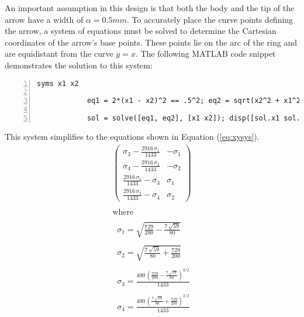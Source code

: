         An important assumption in this design is that both the body and the 
        tip of the arrow have a width of $\alpha=0.5 mm$. To accurately place
        the curve points defining the arrow, a system of equations must be 
        solved to determine the Cartesian coordinates of the arrow's base points. 
        These points lie on the arc of the ring and are equidistant from the curve 
        $y=x$. The following MATLAB code snippet demonstrates the solution to this 
        system:
        \begin{lstlisting}[frame=single, numbers=left, style=Matlab-Pyglike]
            syms x1 x2

            eq1 = 2*(x1 - x2)^2 == .5^2; eq2 = sqrt(x2^2 + x1^2) == 2.7;

            sol = solve([eq1, eq2], [x1 x2]); disp([sol.x1 sol.x2]);  
        \end{lstlisting}
        
        This system simplifies to the equations shown in Equation (\ref{eq:xysys}).
        \begin{equation}
            \label{eq:xysys}
            \displaystyle \begin{array}{l} 
                \left(\begin{array}{cc} 
                    \sigma_3 -\frac{2916\,\sigma_1 }{1433} & -\sigma_1 \\
                    \sigma_4 -\frac{2916\,\sigma_2 }{1433} & -\sigma_2 \\
                    \frac{2916\,\sigma_1 }{1433}-\sigma_3  & \sigma_1 \\
                    \frac{2916\,\sigma_2 }{1433}-\sigma_4  & \sigma_2  
                \end{array}\right)\\
                \mathrm{}\\
                \textrm{where}\\
                \mathrm{}\\
                \;\;\sigma_1 =\sqrt{\frac{729}{200}-\frac{7\,\sqrt{59}}{80}}\\
                \mathrm{}\\
                \;\;\sigma_2 =\sqrt{\frac{7\,\sqrt{59}}{80}+\frac{729}{200}}\\
                \mathrm{}\\
                \;\;\sigma_3 =\frac{400\,{{\left(\frac{729}{200}-\frac{7\,\sqrt{59}}{80}\right)}}^{3/2} }{1433}\\
                \mathrm{}\\
                \;\;\sigma_4 =\frac{400\,{{\left(\frac{7\,\sqrt{59}}{80}+\frac{729}{200}\right)}}^{3/2} }{1433}
            \end{array}
        \end{equation}

